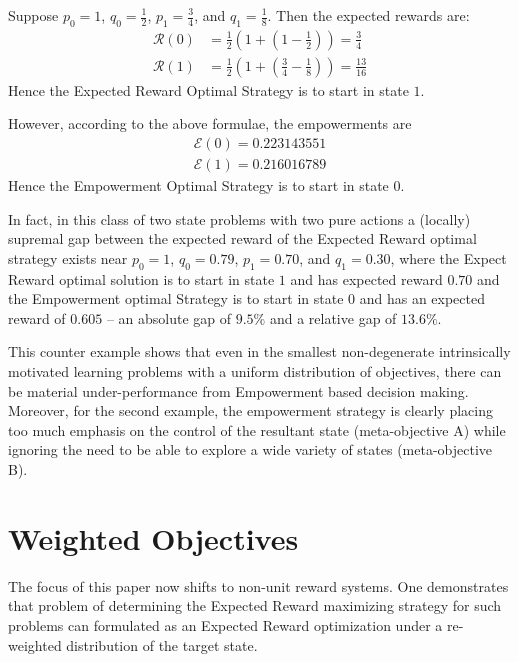 \documentclass{article}
\newcommand{\Ee}{\mathcal{E}}
\newcommand{\Rr}{\mathcal{R}}
\begin{document}
Suppose $p_0=1$, $q_0=\frac{1}{2}$, $p_1=\frac{3}{4}$, and $q_1 = \frac{1}{8}$. Then the expected rewards are:
\begin{align*}
\Rr(0) &= \frac{1}{2}\left(1+\left(1-\frac{1}{2}\right)\right)=\frac{3}{4}\\
\Rr(1) &= \frac{1}{2}\left(1+\left(\frac{3}{4}-\frac{1}{8}\right)\right)=\frac{13}{16}
\end{align*}
Hence the Expected Reward Optimal Strategy is to start in state $1$.

However, according to the above formulae, the empowerments are
\begin{align*}
\Ee(0)=0.223143551\\
\Ee(1)=0.216016789 
\end{align*}
Hence the Empowerment Optimal Strategy is to start in state $0$.

In fact, in this class of two state problems with two pure actions a (locally) supremal gap between the expected reward of the Expected Reward optimal strategy exists near $p_0=1$, $q_0=0.79$, $p_1=0.70$, and $q_1 = 0.30$, where the Expect Reward optimal solution is to start in state $1$ and has expected reward $0.70$ and the Empowerment optimal Strategy is to start in state $0$ and has an expected reward of $0.605$ -- an absolute gap of $9.5\%$ and a relative gap of $13.6\%$.

This counter example shows that even in the smallest non-degenerate intrinsically motivated learning problems with a uniform distribution of objectives, there can be material under-performance from Empowerment based decision making. Moreover, for the second example, the empowerment strategy is clearly placing too much emphasis on the control of the resultant state (meta-objective A) while ignoring the need to be able to explore a wide variety of states (meta-objective B).
\section{Weighted Objectives}
The focus of this paper now shifts to non-unit reward systems. One demonstrates that problem of determining the Expected Reward maximizing strategy for such problems can formulated as an Expected Reward optimization under a re-weighted distribution of the target state.
\end{document}
